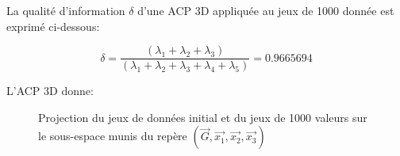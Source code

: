\documentclass[a4paper]{article}
\begin{document}
\begin{appendices}
La qualité d'information $\delta$ d'une ACP 3D appliquée au jeux de 1000 donnée  est exprimé ci-dessous:

$$\delta=\frac{(\lambda_{1}+\lambda_{2}+\lambda_{3})}{(\lambda_{1}+\lambda_{2}+\lambda_{3}+\lambda_{4}+\lambda_{5})}=0.9665694$$

L'ACP 3D donne:

\begin{figure}[H]
\hfill
{}
\caption{Projection du jeux de données initial et du jeux de 1000 valeurs sur le sous-espace munis du repère $(\vec{G},\vec{x_{1}},\vec{x_{2}},\vec{x_{3}})$}\label{fig:somefiglabel}
\end{figure}



\end{appendices}
\end{document}
